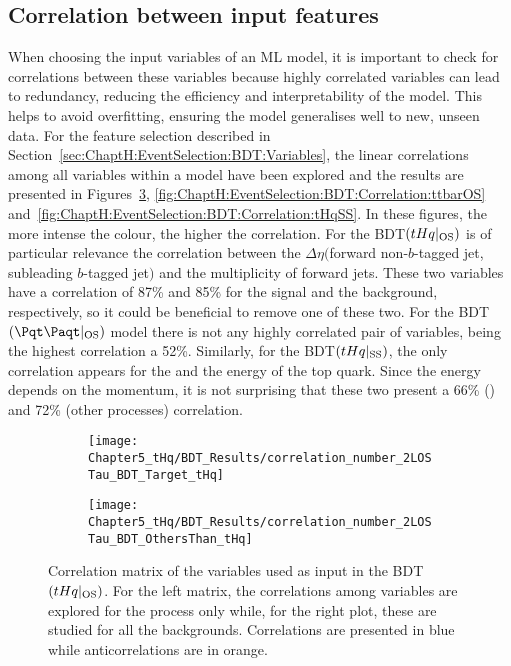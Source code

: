 \subsection{Correlation between input features}
\label{sec:BDT:AdditionalMaterial:Region:Correlations}
When choosing the input variables of an ML model, it is important to check for correlations 
between these variables because highly correlated variables can lead to redundancy, 
reducing the efficiency and interpretability of the model. This helps to avoid overfitting, 
ensuring the model generalises well to new, unseen data. 
For the feature selection described in Section~\ref{sec:ChaptH:EventSelection:BDT:Variables},
the linear correlations among all variables within a model have
been explored and the results are presented in Figures~\ref{fig:ChaptH:EventSelection:BDT:Correlation:tHqOS},
\ref{fig:ChaptH:EventSelection:BDT:Correlation:ttbarOS} and~\ref{fig:ChaptH:EventSelection:BDT:Correlation:tHqSS}.
In these figures, the more intense the colour, the higher the correlation. 
For the BDT$(tHq|_{\text{OS}})$ is of particular relevance the correlation between the 
$\Delta \eta ($forward non-$b$-tagged jet, subleading $b$-tagged jet$)$ and the multiplicity
of forward jets. These two variables have a correlation of 87\% and 85\% for the signal and the
background, respectively, so it could be beneficial to remove one of these two. 
For the BDT$(\ttbar|_{\text{OS}})$ model there is not any highly correlated pair of variables, being
the highest correlation a 52\%. 
Similarly, for the BDT$(tHq|_{\text{SS}})$, the only correlation appears for the \pT and the energy
of the top quark. Since the energy depends on the momentum, it is not surprising that these two
present a 66\% (\ttbar) and 72\% (other processes) correlation.



\begin{figure}[h]
\centering
\begin{subfigure}{.475\textwidth}
  \centering
  \texttt{[image: Chapter5\_tHq/BDT\_Results/correlation\_number\_2LOSTau\_BDT\_Target\_tHq]}
  \label{fig:ChaptH:EventSelection:BDT:Correlation:tHqOS:target}
\end{subfigure}%
\begin{subfigure}{.475\textwidth}
  \centering
  \texttt{[image: Chapter5\_tHq/BDT\_Results/correlation\_number\_2LOSTau\_BDT\_OthersThan\_tHq]}
  \label{fig:ChaptH:EventSelection:BDT:Correlation:tHqOS:rest}
\end{subfigure}
\caption{Correlation matrix of the variables used as input in the BDT$(tHq|_{\text{OS}})$. 
For the left matrix, the correlations among variables are explored for the \tHq process only while, for the right plot, these
are studied for all the backgrounds. Correlations are presented in blue while anticorrelations are in orange.}
\label{fig:ChaptH:EventSelection:BDT:Correlation:tHqOS}
\end{figure}


